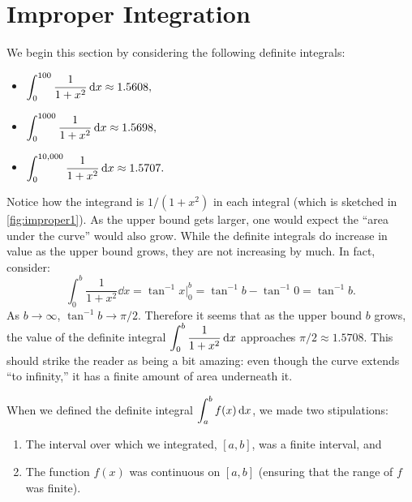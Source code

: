 \section{Improper Integration}\label{sec:improper_integration}

We begin this section by considering the following definite integrals:
\begin{itemize}
\item	$\displaystyle \int_0^{100}\frac1{1+x^2}\operatorname{d}\! x \approx 1.5608,$
\item	$\displaystyle \int_0^{1000}\frac1{1+x^2}\operatorname{d}\! x \approx 1.5698,$
\item	$\displaystyle \int_0^{10,000}\frac1{1+x^2}\operatorname{d}\! x \approx 1.5707.$
\end{itemize}

Notice how the integrand is $1/(1+x^2)$ in each integral (which is sketched in \autoref{fig:improper1}). As the upper bound gets larger, one would expect the ``area under the curve'' would also grow. While the definite integrals do increase in value as the upper bound grows, they are not  increasing by much. In fact, consider:
\[\int_0^b \frac{1}{1+x^2}\dd x = \tan^{-1}x\Big|_0^b = \tan^{-1}b-\tan^{-1}0 = \tan^{-1}b.\]
As $b\rightarrow \infty$, $\tan^{-1}b \rightarrow \pi/2.$ Therefore it seems that as the upper bound $b$ grows, the value of the definite integral $\displaystyle \int_0^b\frac{1}{1+x^2}\operatorname{d}\! x$ approaches $\pi/2\approx 1.5708$. This should strike the reader as being a bit amazing: even though the curve extends ``to infinity,'' it has a finite amount of area underneath it.


When we defined the definite integral $\displaystyle\int_a^b f(x)\operatorname{d}\! x$, we made two stipulations:
	\begin{enumerate}
	\item		The interval over which we integrated, $[a,b]$, was a finite interval, and
	\item		The function $f(x)$ was continuous on $[a,b]$ (ensuring that the range of $f$ was finite).
	\end{enumerate}
	
